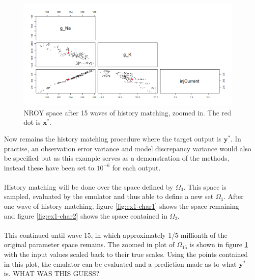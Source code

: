 \documentclass{article}
\newcommand{\inputVec}{\mathbf{x}}
\newcommand{\outputVec}{\mathbf{y}}
\newcommand{\NROYspace}{\Omega}
\begin{document}
\begin{figure}[t]
    \centering
    \includegraphics[width=\linewidth]{Example1/char15_zoomed_orig.png}
    \caption{NROY space after 15 waves of history matching, zoomed in. The red dot is $\inputVec^*$.}
    \label{fig:ex1-char15_zoomed}
\end{figure}
Now remains the history matching procedure where the target output is $\outputVec^*$. In practise, an observation error variance and model discrepancy variance would also be specified but as this example serves as a demonstration of the methods, instead these have been set to $10^{-6}$ for each output.\\\\
History matching will be done over the space defined by $\NROYspace_0$. This space is sampled, evaluated by the emulator and thus able to define a new set $\NROYspace_1$. After one wave of history matching, figure \ref{fig:ex1-char1} shows the space remaining and figure \ref{fig:ex1-char2} shows the space contained in $\NROYspace_2$.\\\\
This continued until wave 15, in which approximately 1/5 millionth of the original parameter space remains. The zoomed in plot of $\NROYspace_15$ is shown in figure \ref{fig:ex1-char15_zoomed} with the input values scaled back to their true scales. Using the points contained in this plot, the emulator can be evaluated and a prediction made as to what $\outputVec^*$ is. WHAT WAS THIS GUESS?
\newpage


\end{document}
